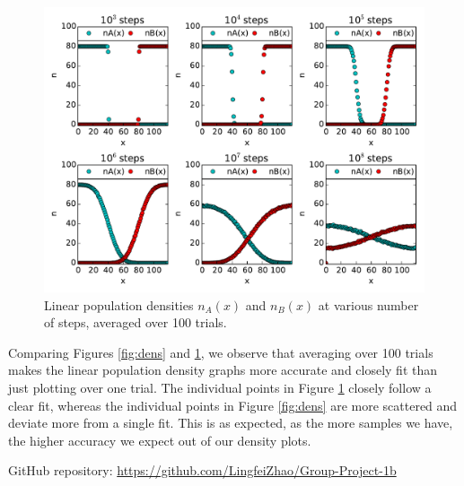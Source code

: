 \documentclass{article}
\begin{document}
\begin{figure}[H]
\centering
\includegraphics[width=12cm]{GP1_3c.pdf}
\caption{Linear population densities $n_{A}(x)$ and $n_{B}(x)$ at various number of steps, averaged over 100 trials.}
\label{fig:avgdens}
\end{figure}

\noindent Comparing Figures \ref{fig:dens} and \ref{fig:avgdens}, we observe that averaging over 100 trials makes the linear population density graphs more accurate and closely fit than just plotting over one trial. The individual points in Figure \ref{fig:avgdens} closely follow a clear fit, whereas the individual points in Figure \ref{fig:dens} are more scattered and deviate more from a single fit. This is as expected, as the more samples we have, the higher accuracy we expect out of our density plots.\par
\bigskip
\noindent GitHub repository: \url{https://github.com/LingfeiZhao/Group-Project-1b}
\end{document}
